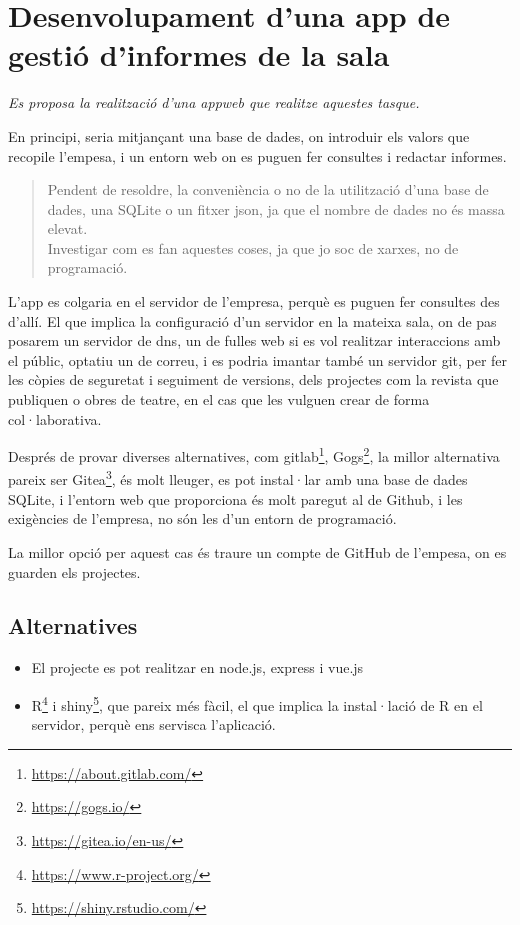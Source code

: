 \documentclass[
  10pt,
]{krantz}
\DeclareRobustCommand{\href}[2]{#2\footnote{\url{#1}}}
\providecommand{\tightlist}{%
  \setlength{\itemsep}{0pt}\setlength{\parskip}{0pt}}
\begin{document}
\hypertarget{desenvolupament-duna-app-de-gestiuxf3-dinformes-de-la-sala}{%
\section{Desenvolupament d'una app de gestió d'informes de la sala}\label{desenvolupament-duna-app-de-gestiuxf3-dinformes-de-la-sala}}

\emph{Es proposa la realització d'una appweb que realitze aquestes tasque.}

En principi, seria mitjançant una base de dades, on introduir els valors que recopile l'empesa, i un entorn web on es puguen fer consultes i redactar informes.

\begin{quote}
Pendent de resoldre, la conveniència o no de la utilització d'una base de dades, una SQLite o un fitxer json, ja que el nombre de dades no és massa elevat.\\
Investigar com es fan aquestes coses, ja que jo soc de xarxes, no de programació.
\end{quote}

L'app es colgaria en el servidor de l'empresa, perquè es puguen fer consultes des d'allí. El que implica la configuració d'un servidor en la mateixa sala, on de pas posarem un servidor de dns, un de fulles web si es vol realitzar interaccions amb el públic, optatiu un de correu, i es podria imantar també un servidor git, per fer les còpies de seguretat i seguiment de versions, dels projectes com la revista que publiquen o obres de teatre, en el cas que les vulguen crear de forma col·laborativa.

Després de provar diverses alternatives, com \href{https://about.gitlab.com/}{gitlab}, \href{https://gogs.io/}{Gogs}, la millor alternativa pareix ser \href{https://gitea.io/en-us/}{Gitea}, és molt lleuger, es pot instal·lar amb una base de dades SQLite, i l'entorn web que proporciona és molt paregut al de Github, i les exigències de l'empresa, no són les d'un entorn de programació.

La millor opció per aquest cas és traure un compte de GitHub de l'empesa, on es guarden els projectes.

\hypertarget{alternatives}{%
\subsection{Alternatives}\label{alternatives}}

\begin{itemize}
\tightlist
\item
  El projecte es pot realitzar en node.js, express i vue.js
\item
  \href{https://www.r-project.org/}{R} i \href{https://shiny.rstudio.com/}{shiny}, que pareix més fàcil, el que implica la instal·lació de R en el servidor, perquè ens servisca l'aplicació.
\end{itemize}
\end{document}
